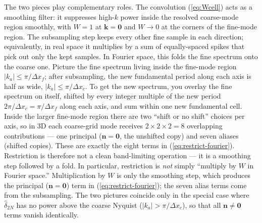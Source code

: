 \documentclass[12pt]{article}
\begin{document}
The two pieces play complementary roles. The convolution
(\ref{eq:Wcell}) acts as a smoothing filter: it suppresses high-$k$
power inside the resolved coarse-mode region smoothly, with $W=1$ at
$\mathbf k=\mathbf 0$ and $W\!\to\!0$ at the corners of the fine-mode
region. The subsampling step keeps every other fine sample in each
direction; equivalently, in real space it multiplies by a sum of
equally-spaced spikes that pick out only the kept samples. In Fourier
space, this folds the fine spectrum onto the coarse one. Picture the
fine spectrum living inside the fine-mode region $|k_a|\le\pi/\Delta x_f$;
after subsampling, the new fundamental period along each axis is half
as wide, $|k_a|\le\pi/\Delta x_c$. To get the new spectrum, you overlay
the fine spectrum on itself, shifted by every integer multiple of the
new period $2\pi/\Delta x_c=\pi/\Delta x_f$ along each axis, and sum
within one new fundamental cell. Inside the larger fine-mode region
there are two ``shift or no shift'' choices per axis, so in 3D each
coarse-grid mode receives $2\times 2\times 2 = 8$ overlapping
contributions --- one principal ($\mathbf n=\mathbf 0$, the unshifted
copy) and seven aliases (shifted copies). These are exactly the eight
terms in (\ref{eq:restrict-fourier}). Restriction is therefore not a clean
band-limiting operation --- it is a smoothing step followed by a fold.
In particular, restriction is \emph{not} simply ``multiply by $W$ in
Fourier space.'' Multiplication by $W$ is only the smoothing step,
which produces the principal ($\mathbf n=\mathbf 0$) term in
(\ref{eq:restrict-fourier}); the seven alias terms come from the
subsampling. The two pictures coincide only in the special case where
$\hat\delta_{2N}$ has no power above the coarse Nyquist
($|k_a|>\pi/\Delta x_c$), so that all $\mathbf n\ne\mathbf 0$ terms
vanish identically.
\end{document}

